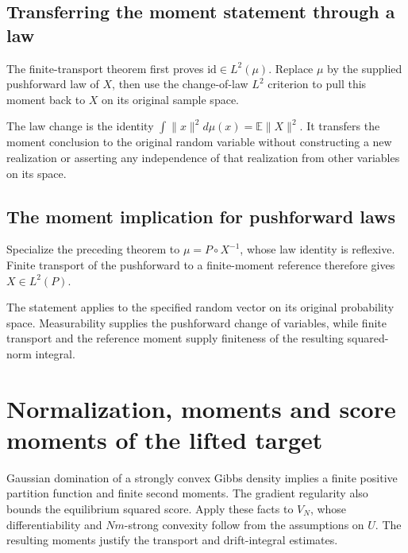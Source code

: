 \documentclass[11pt,a4paper]{article}
\begin{document}
\subsection{\texorpdfstring{Transferring the moment statement through a law}{Transferring the moment statement through a law}}


The finite-transport theorem first proves \(\mathrm{id}\in L^2(\mu)\). Replace \(\mu\) by the supplied pushforward law of \(X\), then use the change-of-law \(L^2\) criterion to pull this moment back to \(X\) on its original sample space.



The law change is the identity \(\int\|x\|^2d\mu(x)=\mathbb E\|X\|^2\). It transfers the moment conclusion to the original random variable without constructing a new realization or asserting any independence of that realization from other variables on its space.


\subsection{\texorpdfstring{The moment implication for pushforward laws}{The moment implication for pushforward laws}}


Specialize the preceding theorem to \(\mu=P\circ X^{-1}\), whose law identity is reflexive. Finite transport of the pushforward to a finite-moment reference therefore gives \(X\in L^2(P)\).



The statement applies to the specified random vector on its original probability space. Measurability supplies the pushforward change of variables, while finite transport and the reference moment supply finiteness of the resulting squared-norm integral.


\section{\texorpdfstring{Normalization, moments and score moments of the lifted target}{Normalization, moments and score moments of the lifted target}}


Gaussian domination of a strongly convex Gibbs density implies a finite positive partition function and finite second moments. The gradient regularity also bounds the equilibrium squared score. Apply these facts to \(V_N\), whose differentiability and \(Nm\)-strong convexity follow from the assumptions on \(U\). The resulting moments justify the transport and drift-integral estimates.
\end{document}
